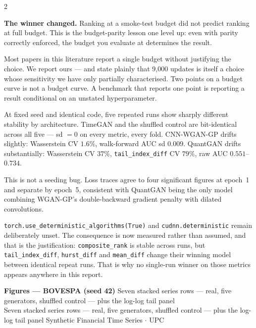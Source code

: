 \documentclass[10pt]{article}
\newcommand{\purplebox}[2]{\begin{tcolorbox}[mybox={Purple}{LBg},title={#1}]#2\end{tcolorbox}}
\newcommand{\pagehead}[2]{%
  \begin{tcolorbox}[enhanced,arc=0pt,outer arc=0pt,boxrule=0pt,
    colback=Navy,colframe=Navy,
    top=5pt,bottom=5pt,left=8pt,right=8pt,
    before skip=0pt,after skip=10pt]
  {\color{white}\large\bfseries #1}%
  \ifx\relax#2\relax\else\\[1pt]{\color{blue!30!white}\small #2}\fi
  \hfill{\color{blue!20!white}\footnotesize Synthetic Financial Time Series $\cdot$ UPC}
  \end{tcolorbox}}
\begin{document}
\begin{multicols}{2}
{\smallskip
\textbf{The winner changed.} Ranking at a smoke-test budget did not predict ranking at full budget. This is the budget-parity lesson one level up: even with parity correctly enforced, the budget you evaluate at determines the result.

\smallskip
Most papers in this literature report a single budget without justifying the choice. We report ours --- and state plainly that 9,000 updates is itself a choice whose sensitivity we have only partially characterised. Two points on a budget curve is not a budget curve. A benchmark that reports one point is reporting a result conditional on an unstated hyperparameter.}

\purplebox{Run-to-Run Nondeterminism at Fixed Seed}{%
At fixed seed and identical code, five repeated runs show sharply different stability by architecture. TimeGAN and the shuffled control are bit-identical across all five --- sd $=0$ on every metric, every fold. CNN-WGAN-GP drifts slightly: Wasserstein CV $1.6\%$, walk-forward AUC sd $0.009$. QuantGAN drifts substantially: Wasserstein CV $37\%$, \texttt{tail\_index\_diff} CV $79\%$, raw AUC $0.551$--$0.734$.

\smallskip
This is not a seeding bug. Loss traces agree to four significant figures at epoch~1 and separate by epoch~5, consistent with QuantGAN being the only model combining WGAN-GP's double-backward gradient penalty with dilated convolutions.

\smallskip
\texttt{torch.use\_deterministic\_algorithms(True)} and \texttt{cudnn.deterministic} remain deliberately unset. The consequence is now measured rather than assumed, and that is the justification: \texttt{composite\_rank} is stable across runs, but \texttt{tail\_index\_diff}, \texttt{hurst\_diff} and \texttt{mean\_diff} change their winning model between identical repeat runs. That is why no single-run winner on those metrics appears anywhere in this report.}

\end{multicols}

\clearpage

\pagehead{Figures --- BOVESPA (seed 42)}
         {Seven stacked series rows --- real, five generators, shuffled control --- plus the log-log tail panel}
\end{document}
